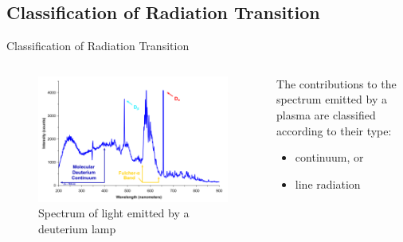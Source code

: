 \documentclass[final]{beamer}
\begin{document}
\subsection{Classification of Radiation Transition}
\begin{frame}{Classification of Radiation Transition}
  \begin{columns}%
  \begin{column}{0.6\textwidth}
  \begin{figure}
    \includegraphics[width=\textwidth]{figures/Deuterium_lamp_1.png} 
    \caption{Spectrum of light emitted by a deuterium lamp}
  \end{figure}
  \end{column}  
  \begin{column}{0.4\textwidth}
  The contributions to the spectrum emitted by a plasma are classified according to their type:
  \begin{itemize}
    \item continuum, or
    \item line radiation
  \end{itemize}
  \end{column}
  \end{columns}
\end{frame}
\end{document}
